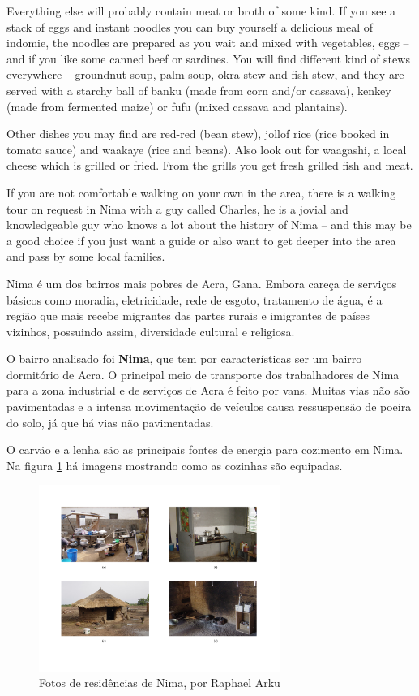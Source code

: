 Everything else will probably contain meat or broth of some kind. If you see a stack of eggs and instant noodles you can buy yourself a delicious meal of indomie, the noodles are prepared as you wait and mixed with vegetables, eggs – and if you like some canned beef or sardines. You will find different kind of stews everywhere – groundnut soup, palm soup, okra stew and fish stew, and they are served with a starchy ball of banku (made from corn and/or cassava), kenkey (made from fermented maize) or fufu (mixed cassava and plantains).

Other dishes you may find are red-red (bean stew), jollof rice (rice booked in tomato sauce) and waakaye (rice and beans). Also look out for waagashi, a local cheese which is grilled or fried. From the grills you get fresh grilled fish and meat.

If you are not comfortable walking on your own in the area, there is a walking tour on request in Nima with a guy called Charles, he is a jovial and knowledgeable guy who knows a lot about the history of Nima – and this may be a good choice if you just want a guide or also want to get deeper into the area and pass by some local families.



Nima é um dos bairros mais pobres de Acra, Gana. 
Embora careça de serviços básicos como moradia, eletricidade, rede de esgoto, 
tratamento de água, é a região que mais recebe migrantes das partes rurais e
imigrantes de países vizinhos, possuindo assim, diversidade cultural e religiosa.

O bairro analisado foi \textbf{Nima}, que tem por características
ser um bairro dormitório de Acra. O principal meio de transporte
dos trabalhadores de Nima para a zona industrial e de serviços de Acra é 
feito por vans. Muitas vias não são pavimentadas e a intensa movimentação
de veículos causa ressuspensão de poeira do solo, já que há vias não
pavimentadas.

O carvão e a lenha são as principais fontes de energia para cozimento 
em Nima. Na figura \ref{fig:nima} há imagens mostrando como as cozinhas
são equipadas. 

\begin{figure}[H]
  \centering
    \includegraphics[width=0.7\textwidth]{../inputs/images/zheng/nima.pdf}
    \caption{Fotos de residências de Nima, por Raphael Arku \label{fig:nima}}
\end{figure}

